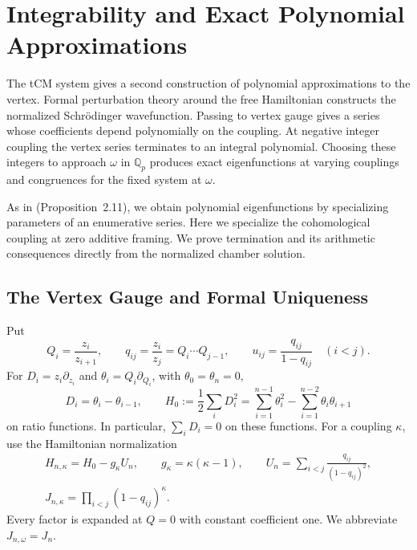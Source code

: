 \documentclass[11pt]{amsart}
\theoremstyle{definition}
\theoremstyle{remark}
\numberwithin{equation}{section}
\newcommand{\Q}{\mathbb Q}
\begin{document}
\section{Integrability and Exact Polynomial Approximations}
\label{cg:section}
The tCM system gives a second construction of polynomial
approximations to the vertex. Formal perturbation theory around
the free Hamiltonian constructs the normalized Schr\"odinger
wavefunction. Passing to vertex gauge gives a series whose
coefficients depend polynomially on the coupling. At negative
integer coupling the vertex series terminates to an integral
polynomial.
Choosing these integers to approach $\omega$ in $\Q_p$ produces
exact eigenfunctions at varying couplings and congruences for the
fixed system at $\omega$.

As in \cite{K21} (Proposition~2.11), we obtain polynomial
eigenfunctions by specializing parameters of an enumerative
series. Here we specialize the cohomological coupling at zero
additive framing. We prove termination and its arithmetic
consequences directly from the normalized chamber solution.

\subsection{The Vertex Gauge and Formal Uniqueness}
Put
\begin{equation}\label{cg:variables}
 Q_i=\frac{z_i}{z_{i+1}},\qquad
 q_{ij}=\frac{z_i}{z_j}=Q_i\cdots Q_{j-1},\qquad
 u_{ij}=\frac{q_{ij}}{1-q_{ij}}\quad(i<j).
\end{equation}
For $D_i=z_i\partial_{z_i}$ and
$\theta_i=Q_i\partial_{Q_i}$, with $\theta_0=\theta_n=0$,
\begin{equation}\label{cg:relative-derivatives}
 D_i=\theta_i-\theta_{i-1},\qquad
 H_0:=\frac12\sum_iD_i^2
 =\sum_{i=1}^{n-1}\theta_i^2
   -\sum_{i=1}^{n-2}\theta_i\theta_{i+1}
\end{equation}
on ratio functions. In particular, $\sum_iD_i=0$ on these
functions. For a coupling $\kappa$, use the Hamiltonian normalization
\cite{C71,S71,M75}
\begin{equation}\label{cg:schrodinger}
\begin{gathered}
 H_{n,\kappa}=H_0-g_\kappa U_n,\qquad
 g_\kappa=\kappa(\kappa-1),\qquad
 U_n=\sum_{i<j}\frac{q_{ij}}{(1-q_{ij})^2},\\
 J_{n,\kappa}=\prod_{i<j}(1-q_{ij})^\kappa.
\end{gathered}
\end{equation}
Every factor is expanded at $Q=0$ with constant coefficient one.
We abbreviate $J_{n,\omega}=J_n$.
\end{document}
